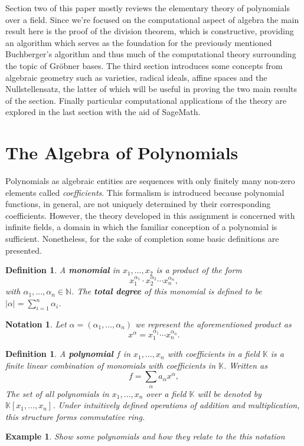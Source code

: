 \documentclass[a4paper,12pt]{article}
\newtheorem{definition}[theorem]{Definition}
\newtheorem{example}[theorem]{Example}
\newtheorem{notation}[theorem]{Notation}
\newcommand{\KK}{\mathbb{K}}
\newcommand{\NN}{\mathbb{N}}
\begin{document}
Section two of this paper mostly reviews the elementary theory of polynomials over a field. Since we're focused on the computational aspect of algebra the main result here is the proof of the division theorem, which is constructive, providing an algorithm which serves as the foundation for the previously mentioned Buchberger's algorithm and thus much of the computational theory surrounding the topic of Gr\"obner bases. The third section introduces some concepts from algebraic geometry such as varieties, radical ideals, affine spaces and the Nullstellensatz, the latter of which will be useful in proving the two main results of the section. Finally particular computational applications of the theory are explored in the last section with the aid of SageMath.

\section{The Algebra of Polynomials}
Polynomials as algebraic entities are sequences with only finitely many non-zero elements called \textit{coefficients}. This formalism is introduced because polynomial functions, in general, are not uniquely determined by their corresponding coefficients. However, the theory developed in this assignment is concerned with infinite fields, a domain in which the familiar conception of a polynomial is sufficient. Nonetheless, for the sake of completion some basic definitions are presented.

\begin{definition}
A \textbf{monomial} in $x_1, \ldots, x_2$ is a product of the form $$x_1^{\alpha_1} \cdot x_2^{\alpha_2} \cdots x_n^{\alpha_n},$$
	with $\alpha_1, \ldots, \alpha_n \in \NN$. The \textbf{total degree} of this monomial is defined to be $ |\alpha| = \sum_{i = 1}^{n}\alpha_i$.
\end{definition} 
\begin{notation}
	Let $\alpha = (\alpha_1, \ldots , \alpha_n)$ we represent the aforementioned product as $$x^\alpha = x_1^{\alpha_1} \cdots x_n^{\alpha_n}.$$
\end{notation}
\begin{definition}
	A \textbf{polynomial} $f$ in $x_1, \ldots, x_n$ with coefficients in a field $\KK$ is a finite linear combination of monomials with coefficients in $\KK$. Written as
	$$
	f = \sum_{\alpha}a_{\alpha}x^\alpha,$$
	The set of all polynomials in $x_1, \ldots, x_n$ over a field $\KK$ will be denoted by $\KK[x_1, \ldots, x_n]$. Under intuitively defined operations of addition and multiplication, this structure forms commutative ring.
\end{definition}
\begin{example}
	Show some polynomials and how they relate to the this notation
\end{example}
\end{document}
